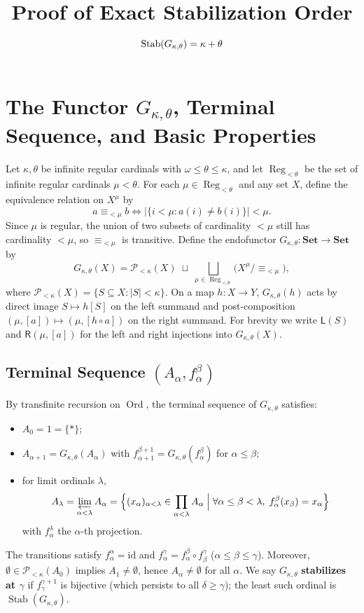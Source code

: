 \documentclass[11pt,a4paper]{article}
\title{Proof of Exact Stabilization Order $\Stab(G_{\kappa,\theta}) = \kappa + \theta$}
\date{}
\theoremstyle{definition}
\theoremstyle{plain}
\newcommand{\Stab}{\operatorname{Stab}}
\newcommand{\Reg}{\operatorname{Reg}}
\newcommand{\Ord}{\operatorname{Ord}}
\newcommand{\id}{\mathrm{id}}
\newcommand{\Set}{\mathbf{Set}}
\begin{document}
\maketitle

\section{The Functor $G_{\kappa,\theta}$, Terminal Sequence, and Basic Properties}

Let $\kappa, \theta$ be infinite regular cardinals with $\omega \le \theta \le \kappa$, and let $\Reg_{<\theta}$ be the set of infinite regular cardinals $\mu < \theta$. For each $\mu \in \Reg_{<\theta}$ and any set $X$, define the equivalence relation on $X^\mu$ by
\[
  a \equiv_{<\mu} b \iff \bigl|\{ i < \mu : a(i) \neq b(i) \}\bigr| < \mu.
\]
Since $\mu$ is regular, the union of two subsets of cardinality $<\mu$ still has cardinality $<\mu$, so $\equiv_{<\mu}$ is transitive. Define the endofunctor $G_{\kappa,\theta} : \Set \to \Set$ by
\[
  G_{\kappa,\theta}(X) = \mathcal{P}_{<\kappa}(X) \;\sqcup\; \bigsqcup_{\mu \in \Reg_{<\theta}} \bigl(X^\mu / {\equiv_{<\mu}}\bigr),
\]
where $\mathcal{P}_{<\kappa}(X) = \{ S \subseteq X : |S| < \kappa \}$. On a map $h : X \to Y$, $G_{\kappa,\theta}(h)$ acts by direct image $S \mapsto h[S]$ on the left summand and post-composition $(\mu, [a]) \mapsto (\mu, [h \circ a])$ on the right summand. For brevity we write $\mathsf{L}(S)$ and $\mathsf{R}(\mu, [a])$ for the left and right injections into $G_{\kappa,\theta}(X)$.

\subsection*{Terminal Sequence $(A_\alpha, f_\alpha^\beta)$}

By transfinite recursion on $\Ord$, the terminal sequence of $G_{\kappa,\theta}$ satisfies:
\begin{itemize}[leftmargin=2em]
  \item $A_0 = 1 = \{*\}$;
  \item $A_{\alpha+1} = G_{\kappa,\theta}(A_\alpha)$ with $f_{\alpha+1}^{\beta+1} = G_{\kappa,\theta}(f_\alpha^\beta)$ for $\alpha \le \beta$;
  \item for limit ordinals $\lambda$,
    \[
      A_\lambda = \varprojlim_{\alpha < \lambda} A_\alpha = \Bigl\{ (x_\alpha)_{\alpha < \lambda} \in \prod_{\alpha<\lambda} A_\alpha \;\Big|\; \forall \alpha \le \beta < \lambda,\; f_\alpha^\beta(x_\beta) = x_\alpha \Bigr\}
    \]
    with $f_\alpha^\lambda$ the $\alpha$-th projection.
\end{itemize}
The transitions satisfy $f_\alpha^\alpha = \id$ and $f_\alpha^\gamma = f_\alpha^\beta \circ f_\beta^\gamma$ ($\alpha \le \beta \le \gamma$). Moreover, $\emptyset \in \mathcal{P}_{<\kappa}(A_0)$ implies $A_1 \neq \emptyset$, hence $A_\alpha \neq \emptyset$ for all $\alpha$. We say $G_{\kappa,\theta}$ \textbf{stabilizes at $\gamma$} if $f_\gamma^{\gamma+1}$ is bijective (which persists to all $\delta \ge \gamma$); the least such ordinal is $\Stab(G_{\kappa,\theta})$.
\end{document}
